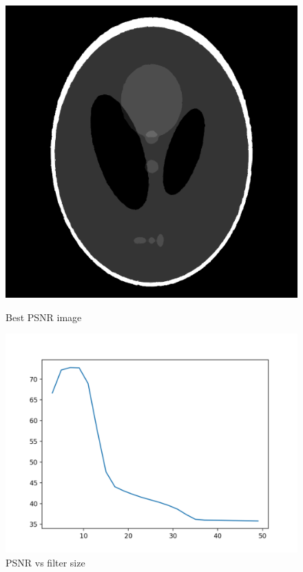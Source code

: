 \documentclass{article}
\begin{document}
    \begin{figure}[!htb]
      \includegraphics[scale=0.3]{./basic_denoising/shepplogan/median_best_sp.png}
      \caption{Best PSNR image}
    \endminipage \hfill
      \includegraphics[scale=.45]{./basic_denoising/shepplogan/median_psnr_sp.png}
      \caption{PSNR vs filter size}
    \endminipage
    \end{figure}
    \pagebreak
\end{document}

